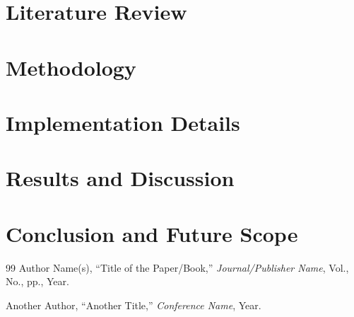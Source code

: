 \documentclass[12pt, a4paper]{report}
\begin{document}
\chapter{Literature Review}
\lipsum[1-5] %

\chapter{Methodology}
\lipsum[6-10]

\chapter{Implementation Details}
\lipsum[11-15]

\chapter{Results and Discussion}
\lipsum[16-20]

\chapter{Conclusion and Future Scope}
\lipsum[21-25]


\clearpage
{}
\begin{thebibliography}{99}
    Author Name(s), ``Title of the Paper/Book,'' \textit{Journal/Publisher Name}, Vol., No., pp., Year.
    
    Another Author, ``Another Title,'' \textit{Conference Name}, Year.
\end{thebibliography}

\clearpage

% 
% 
% 
\end{document}
